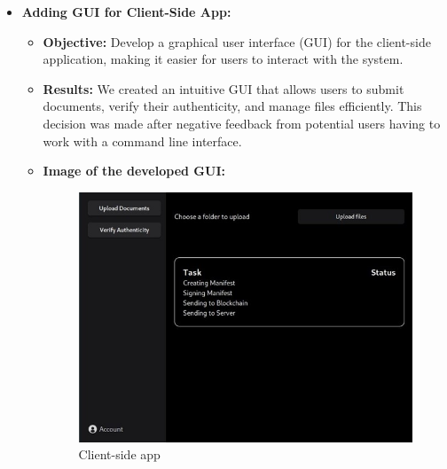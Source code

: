 \documentclass[a4paper,11pt]{article}
\begin{document}
\begin{itemize}
                    \item \textbf{Adding GUI for Client-Side App:}
                    \begin{itemize}
                        \item \textbf{Objective:} Develop a graphical user interface (GUI) for the client-side application, making it easier for users to interact with the system.
                        \item \textbf{Results:} We created an intuitive GUI that allows users to submit documents, verify their authenticity, and manage files efficiently. This decision was made after negative feedback from potential users having to work with a command line interface.
                        \item \textbf{Image of the developed GUI:}
                        \begin{figure}[htbp]
                        \centering
                        \includegraphics[width=0.8\linewidth]{images/client-side app.jpg}
                        \caption{Client-side app} 
                        \end{figure}
                    \end{itemize}
                \end{itemize}

            \pagebreak
\end{document}

